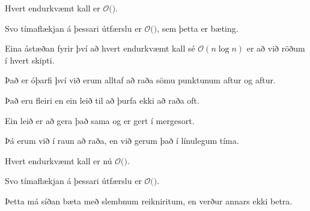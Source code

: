 {
}

{
	{
		\item<1-> Hvert endurkvæmt kall er $\mathcal{O}($\onslide<2->{$n \log n$}$)$.
		\item<3-> Svo tímaflækjan á þessari útfærslu er $\mathcal{O}($$)$, sem þetta er bæting.
		\item<5-> Eina ástæðan fyrir því að hvert endurkvæmt kall sé $\mathcal{O}(n \log n)$ er að við röðum í hvert skipti.
		\item<6-> Það er óþarfi því við erum alltaf að raða sömu punktunum aftur og aftur.
		\item<7-> Það eru fleiri en ein leið til að þurfa ekki að raða oft.
		\item<8-> Ein leið er að gera það sama og er gert í mergesort.
		\item<9-> Þá erum við í raun að raða, en við gerum það í línulegum tíma.
	}
}

{
}

{
	{
		\item<1-> Hvert endurkvæmt kall er nú $\mathcal{O}($\onslide<2->{$\,n\,$}$)$.
		\item<3-> Svo tímaflækjan á þessari útfærslu er $\mathcal{O}($\onslide<4->{$n \log n$}$)$.
		\item<5-> Þetta má síðan bæta með slembnum reikniritum, en verður annars ekki betra.
	}
}

{
}


